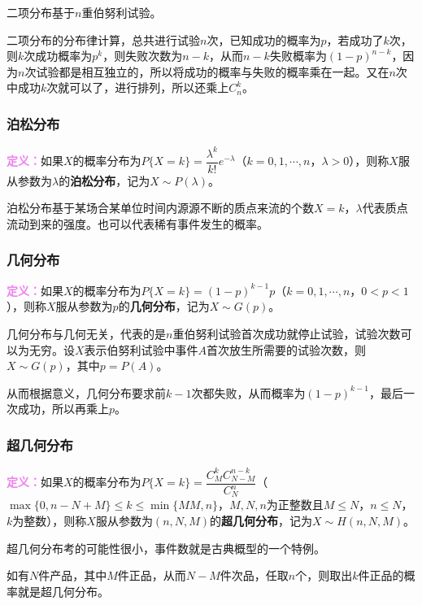 \documentclass[UTF8, 12pt]{ctexart}
\begin{document}
二项分布基于$n$重伯努利试验。

二项分布的分布律计算，总共进行试验$n$次，已知成功的概率为$p$，若成功了$k$次，则$k$次成功概率为$p^k$，则失败次数为$n-k$，从而$n-k$失败概率为$(1-p)^{n-k}$，因为$n$次试验都是相互独立的，所以将成功的概率与失败的概率乘在一起。又在$n$次中成功$k$次就可以了，进行排列，所以还乘上$C_n^k$。

\subsubsection{泊松分布}

\textcolor{violet}{\textbf{定义：}}如果$X$的概率分布为$P\{X=k\}=\dfrac{\lambda^k}{k!}e^{-\lambda}$（$k=0,1,\cdots,n$，$\lambda>0$），则称$X$服从参数为$\lambda$的\textbf{泊松分布}，记为$X\sim P(\lambda)$。

泊松分布基于某场合某单位时间内源源不断的质点来流的个数$X=k$，$\lambda$代表质点流动到来的强度。也可以代表稀有事件发生的概率。

\subsubsection{几何分布}

\textcolor{violet}{\textbf{定义：}}如果$X$的概率分布为$P\{X=k\}=(1-p)^{k-1}p$（$k=0,1,\cdots,n$，$0<p<1$），则称$X$服从参数为$p$的\textbf{几何分布}，记为$X\sim G(p)$。

几何分布与几何无关，代表的是$n$重伯努利试验首次成功就停止试验，试验次数可以为无穷。设$X$表示伯努利试验中事件$A$首次放生所需要的试验次数，则$X\sim G(p)$，其中$p=P(A)$。

从而根据意义，几何分布要求前$k-1$次都失败，从而概率为$(1-p)^{k-1}$，最后一次成功，所以再乘上$p$。

\subsubsection{超几何分布}

\textcolor{violet}{\textbf{定义：}}如果$X$的概率分布为$P\{X=k\}=\dfrac{C_M^kC_{N-M}^{n-k}}{C_N^n}$（$\max\{0,n-N+M\}\leqslant k\leqslant\min\{MM,n\}$，$M,N,n$为正整数且$M\leqslant N$，$n\leqslant N$，$k$为整数），则称$X$服从参数为$(n,N,M)$的\textbf{超几何分布}，记为$X\sim H(n,N,M)$。

超几何分布考的可能性很小，事件数就是古典概型的一个特例。

如有$N$件产品，其中$M$件正品，从而$N-M$件次品，任取$n$个，则取出$k$件正品的概率就是超几何分布。
\end{document}
